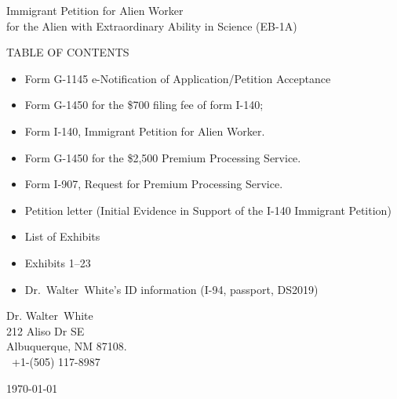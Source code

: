 \documentclass{article}
\newcommand{\fname}{Walter}
\newcommand{\lname}{White}
\newcommand{\fullname}{\fname~\lname}
\newcommand{\dr}{Dr.~\fname~\lname}
\newcommand{\myaddr}{212 Aliso Dr SE \\ Albuquerque, NM 87108. \\ \faMobilePhone \ +1-(505) 117-8987}
\begin{document}
\pagestyle{empty} 
\vspace{15em}

\begin{center}
Immigrant Petition for Alien Worker \\
for the Alien with Extraordinary Ability in Science (EB-1A)
\end{center}

\vspace{2em}
\begin{center}
TABLE OF CONTENTS
\end{center}

\begin{itemize}
    \item Form G-1145 e-Notification of Application/Petition Acceptance
    \item Form G-1450 for the \$700 filing fee of form I-140;
    \item Form I-140, Immigrant Petition for Alien Worker.
    \item Form G-1450 for the \$2,500 Premium Processing Service.
    \item Form I-907, Request for Premium Processing Service.
    \item Petition letter (Initial Evidence in Support of the I-140 Immigrant Petition)
    \item List of Exhibits
    \item Exhibits 1–23
    \item \dr's ID information (I-94, passport, DS2019)
\end{itemize}

% 
% 
% 
% 
% 
%

\pagebreak
\pagestyle{fancy}
\setcounter{page}{1}


\begin{FlushRight}
    Dr. \fullname \\
    \myaddr
    \vspace{-1em}
\end{FlushRight}


\today

\end{document}
